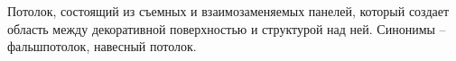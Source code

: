 Потолок, состоящий из съемных и взаимозаменяемых панелей, 
который создает область между декоративной поверхностью и 
структурой над ней. Синонимы -- фальшпотолок, навесный потолок.